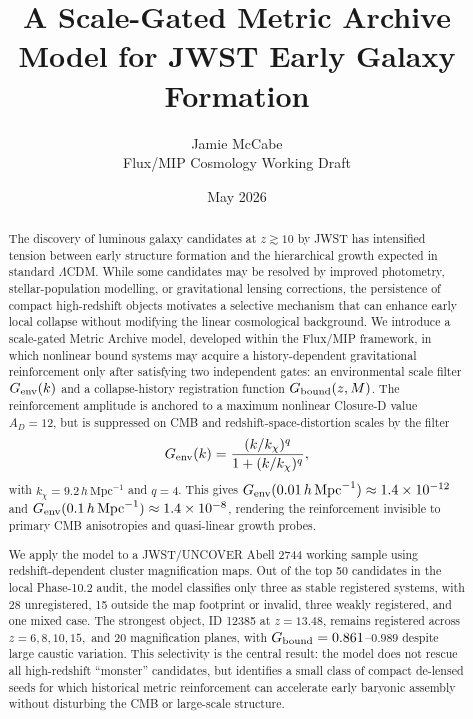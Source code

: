\documentclass[11pt,a4paper]{article}
\title{A Scale-Gated Metric Archive Model for JWST Early Galaxy Formation}
\author{Jamie McCabe\\\small Flux/MIP Cosmology Working Draft}
\date{May 2026}
\newcommand{\LCDM}{$\Lambda$CDM}
\begin{document}
\maketitle

\begin{abstract}
The discovery of luminous galaxy candidates at $z \gtrsim 10$ by JWST has intensified tension between early structure formation and the hierarchical growth expected in standard \LCDM. While some candidates may be resolved by improved photometry, stellar-population modelling, or gravitational lensing corrections, the persistence of compact high-redshift objects motivates a selective mechanism that can enhance early local collapse without modifying the linear cosmological background. We introduce a scale-gated Metric Archive model, developed within the Flux/MIP framework, in which nonlinear bound systems may acquire a history-dependent gravitational reinforcement only after satisfying two independent gates: an environmental scale filter $G_{\rm env}(k)$ and a collapse-history registration function $G_{\rm bound}(z,M)$. The reinforcement amplitude is anchored to a maximum nonlinear Closure-D value $A_D=12$, but is suppressed on CMB and redshift-space-distortion scales by the filter
\begin{equation}
G_{\rm env}(k)=\frac{(k/k_\chi)^q}{1+(k/k_\chi)^q},
\end{equation}
with $k_\chi=9.2\,h\,\mathrm{Mpc}^{-1}$ and $q=4$. This gives $G_{\rm env}(0.01\,h\,\mathrm{Mpc}^{-1})\approx1.4\times10^{-12}$ and $G_{\rm env}(0.1\,h\,\mathrm{Mpc}^{-1})\approx1.4\times10^{-8}$, rendering the reinforcement invisible to primary CMB anisotropies and quasi-linear growth probes.

We apply the model to a JWST/UNCOVER Abell 2744 working sample using redshift-dependent cluster magnification maps. Out of the top 50 candidates in the local Phase-10.2 audit, the model classifies only three as stable registered systems, with 28 unregistered, 15 outside the map footprint or invalid, three weakly registered, and one mixed case. The strongest object, ID 12385 at $z=13.48$, remains registered across $z=6,8,10,15,$ and $20$ magnification planes, with $G_{\rm bound}=0.861$--$0.989$ despite large caustic variation. This selectivity is the central result: the model does not rescue all high-redshift ``monster'' candidates, but identifies a small class of compact de-lensed seeds for which historical metric reinforcement can accelerate early baryonic assembly without disturbing the CMB or large-scale structure.
\end{abstract}
\end{document}
